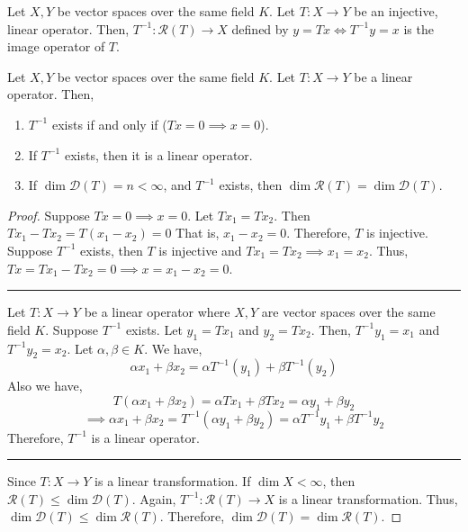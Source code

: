 \begin{definition}[Inverse]
	Let $X,Y$ be vector spaces over the same field $K$.
	Let $T : X \to Y$ be an injective, linear operator.
	Then, $T^{-1} : \mathscr{R}(T) \to X$ defined by $y = Tx \iff T^{-1}y = x$ is the image operator of $T$.
\end{definition}
\begin{theorem}[inverse]
	Let $X,Y$ be vector spaces over the same field $K$.
	Let $T: X \to Y$ be a linear operator.
	Then,
	\begin{enumerate}
		\item $T^{-1}$ exists if and only if ($Tx = 0 \implies x = 0$).
		\item If $T^{-1}$ exists, then it is a linear operator.
		\item If $\dim \mathscr{D}(T) = n < \infty$, and $T^{-1}$ exists, then $\dim \mathscr{R}(T) = \dim \mathscr{D}(T)$.
	\end{enumerate}
	\begin{proof}
		Suppose $Tx = 0 \implies x = 0$.
		Let $Tx_1 = Tx_2$.
		Then $Tx_1 - Tx_2 = T(x_1-x_2) = 0$
		That is, $x_1-x_2 = 0$.
		Therefore, $T$ is injective.
		Suppose $T^{-1}$ exists, then $T$ is injective and $Tx_1 = Tx_2 \implies x_1 = x_2$.
		Thus, $Tx = Tx_1 - Tx_2 = 0 \implies x = x_1 - x_2 = 0$.\\

		\hrule \vspace{1em}

		Let $T : X \to Y$ be a linear operator where $X,Y$ are vector spaces over the same field $K$.
		Suppose $T^{-1}$ exists.
		Let $y_1 = Tx_1$ and $y_2 = Tx_2$.
		Then, $T^{-1}y_1 = x_1$ and $T^{-1}y_2 = x_2$.
		Let $\alpha, \beta \in K$.
		We have, 
		\[ \alpha x_1 + \beta x_2 = \alpha T^{-1}(y_1) + \beta T^{-1}(y_2) \]
		Also we have, 
		\[ T(\alpha x_1 + \beta x_2) = \alpha Tx_1 + \beta Tx_2 = \alpha y_1 + \beta y_2 \]
		\[ \implies \alpha x_1 + \beta x_2 = T^{-1}(\alpha y_1 + \beta y_2) = \alpha T^{-1}y_1 + \beta T^{-1}y_2 \]
		Therefore, $T^{-1}$ is a linear operator.\\

		\hrule \vspace{1em}

		Since $T : X \to Y$ is a linear transformation.
		If $\dim X < \infty$, then $\mathscr{R}(T) \le \dim \mathscr{D}(T)$.
		Again, $T^{-1} : \mathscr{R}(T) \to X$ is a linear transformation.
		Thus, $\dim \mathscr{D}(T) \le \dim \mathscr{R}(T)$.
		Therefore, $\dim \mathscr{D}(T) = \dim \mathscr{R}(T)$.
	\end{proof}
\end{theorem}

